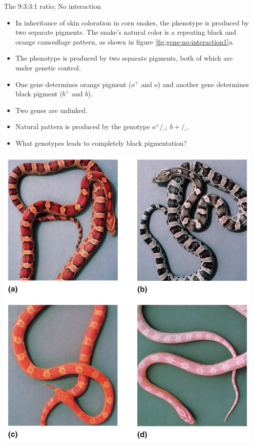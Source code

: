 \documentclass[11pt,dvipsnames,ignorenonframetext,aspectratio=169]{beamer}
\providecommand{\tightlist}{%
  \setlength{\itemsep}{0pt}\setlength{\parskip}{0pt}}
\begin{document}
\begin{frame}{The 9:3:3:1 ratio; No interaction}
\protect\hypertarget{the-9331-ratio-no-interaction}{}

\begin{itemize}
\tightlist
\item
  In inheritance of skin coloration in corn snakes, the phenotype is
  produced by two separate pigments. The snake's natural color is a
  repeating black and orange camouflage pattern, as shown in figure
  \ref{fig:gene-no-interaction1}a.
\item
  The phenotype is produced by two separate pigments, both of which are
  under genetic control.
\item
  One gene determines orange pigment (\(o^+\) and \(o\)) and another
  gene determines black pigment (\(b^+\) and \(b\)).
\item
  Two genes are unlinked.
\item
  Natural pattern is produced by the genotype \(o^+/\_;\ b+/\_\).
\item
  What genotypes leads to completely black pigmentation?
\end{itemize}

\end{frame}

\begin{frame}{}
\protect\hypertarget{section-13}{}

\begin{center}\includegraphics[width=0.45\linewidth]{./../images/gene_no_interaction} \end{center}

\end{frame}
\end{document}
